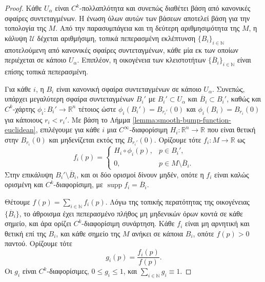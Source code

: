 \documentclass[11pt,a4paper,twoside,openright]{book}
\begin{document}
\begin{proof}
Κάθε $U_\alpha$ είναι $C^k$-πολλαπλότητα και συνεπώς διαθέτει βάση από κανονικές σφαίρες συντεταγμένων. Η ένωση όλων αυτών των βάσεων αποτελεί βάση για την τοπολογία της $M$. Από την παρασυμπάγεια και τη δεύτερη αριθμησιμότητα της $M$, η κάλυψη $\mathcal{U}$ δέχεται αριθμήσιμη, τοπικά πεπερασμένη εκλέπτυνση $\{B_i\}_{i \in \mathbb{N}}$ αποτελούμενη από κανονικές σφαίρες συντεταγμένων, κάθε μία εκ των οποίων περιέχεται σε κάποιο $U_\alpha$. Επιπλέον, η οικογένεια των κλειστοτήτων $\{\overline{B}_i\}_{i \in \mathbb{N}}$ είναι επίσης τοπικά πεπερασμένη.

Για κάθε $i$, η $B_i$ είναι κανονική σφαίρα συντεταγμένων σε κάποιο $U_\alpha$. Συνεπώς, υπάρχει μεγαλύτερη σφαίρα συντεταγμένων $B_i'$ με $B_i' \subset U_\alpha$ και $\overline{B}_i \subset B_i'$, καθώς και $C^k$-χάρτης $\phi_i: B_i' \to \mathbb{R}^n$ τέτοιος ώστε $\phi_i(B_i') = B_{r_i'}(0)$ και $\phi_i(B_i) = B_{r_i}(0)$ για κάποιους $r_i < r_i'$. Με βάση το Λήμμα \ref{lemma:smooth-bump-function-euclidean}, επιλέγουμε για κάθε $i$ μια $C^\infty$-διαφορίσιμη $H_i: \mathbb{R}^n \to \mathbb{R}$ που είναι θετική στην $B_{r_i}(0)$ και μηδενίζεται εκτός της $B_{r_i'}(0)$. Ορίζουμε τότε $f_i: M \to \mathbb{R}$ ως
\begin{equation*}
f_i(p) =
\begin{cases}
H_i \circ \phi_i(p), & p \in B_i', \\
0, & p \in M \setminus \overline{B}_i.
\end{cases}
\end{equation*}
Στην επικάλυψη $B_i' \setminus \overline{B}_i$, και οι δύο ορισμοί δίνουν μηδέν, οπότε η $f_i$ είναι καλώς ορισμένη και $C^k$-διαφορίσιμη, με $\operatorname{supp} f_i = \overline{B}_i$.

Θέτουμε $f(p) = \sum_{i \in \mathbb{N}} f_i(p)$. Λόγω της τοπικής περατότητας της οικογένειας $\{\overline{B}_i\}$, το άθροισμα έχει πεπερασμένο πλήθος μη μηδενικών όρων κοντά σε κάθε σημείο, και άρα ορίζει $C^k$-διαφορίσιμη συνάρτηση. Κάθε $f_i$ είναι μη αρνητική και θετική επί της $B_i$, και κάθε σημείο της $M$ ανήκει σε κάποια $B_i$, οπότε $f(p) > 0$ παντού. Ορίζουμε τότε
\begin{equation*}
g_i(p) = \frac{f_i(p)}{f(p)}.
\end{equation*}
Οι $g_i$ είναι $C^k$-διαφορίσιμες, $0 \le g_i \le 1$, και $\sum_{i \in \mathbb{N}} g_i \equiv 1$.


\end{proof}
\end{document}
